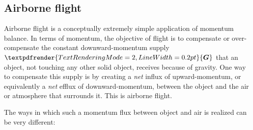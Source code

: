 \documentclass[a4paper,12pt,%
onecolumn,oneside,%
british%
]{memoir}
\renewcommand*{\bm}[1]{\textpdfrender{TextRenderingMode=2,LineWidth=0.2pt}{\boldsymbol{#1}}}
\renewcommand*{\|}[1][]{\nonscript\:#1\vert\nonscript\:\mathopen{}}
\newcommand*{\yG}{\bm{G}}
\begin{document}
\subsection{Airborne flight}
\label{sec:bal_momentum_flight}

Airborne flight is a conceptually extremely simple application of momentum balance.
In terms of momentum, the objective of flight is to compensate or over-compensate the constant downward-momentum supply $\yG$ that an object, not touching any other solid object, receives because of gravity. One way to compensate this supply is by creating a \emph{net} influx of upward-momentum, or equivalently a \emph{net} efflux of downward-momentum, between the object and the air or atmosphere that surrounds it. This is airborne flight.

The ways in which such a momentum flux between object and air is realized can be very different:
\end{document}

